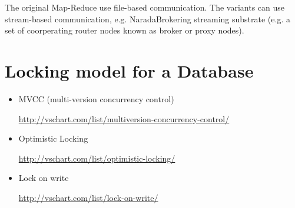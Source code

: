 The original Map-Reduce use file-based communication. The variants can use
stream-based communication, e.g. NaradaBrokering streaming substrate (e.g. a set
of coorperating router nodes known as broker or proxy nodes).

\section{Locking model for a Database}


\begin{itemize}
  \item MVCC (multi-version concurrency control)
  
  \url{http://vschart.com/list/multiversion-concurrency-control/}
  
  \item Optimistic Locking
  
  \url{http://vschart.com/list/optimistic-locking/}
  
  \item Lock on write
  
  \url{http://vschart.com/list/lock-on-write/}
\end{itemize}